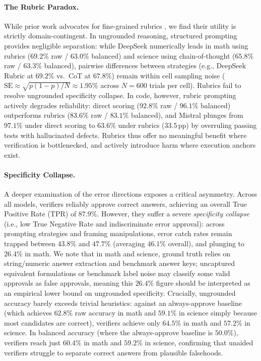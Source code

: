 \paragraph{The Rubric Paradox.}
While prior work advocates for fine-grained rubrics \citep{kim2023prometheus}, we find their utility is strictly domain-contingent. In ungrounded reasoning, structured prompting provides negligible separation: while DeepSeek numerically leads in math using rubrics ($69.2\%$ raw / $63.0\%$ balanced) and science using chain-of-thought ($65.8\%$ raw / $63.3\%$ balanced), pairwise differences between strategies (e.g., DeepSeek Rubric at $69.2\%$ vs.\ CoT at $67.8\%$) remain within cell sampling noise ($\text{SE} \approx \sqrt{p(1-p)/N} \approx 1.95\%$ across $N=600$ trials per cell). Rubrics fail to resolve ungrounded specificity collapse. In code, however, rubric prompting actively degrades reliability: direct scoring ($92.8\%$ raw / $96.1\%$ balanced) outperforms rubrics ($83.6\%$ raw / $83.1\%$ balanced), and Mistral plunges from $97.1\%$ under direct scoring to $63.6\%$ under rubrics ($33.5$\,pp) by overruling passing tests with hallucinated defects. Rubrics thus offer no meaningful benefit where verification is bottlenecked, and actively introduce harm where execution anchors exist.

\paragraph{Specificity Collapse.}
A deeper examination of the error directions exposes a critical asymmetry. Across all models, verifiers reliably approve correct answers, achieving an overall True Positive Rate (TPR) of $87.9\%$. However, they suffer a severe \emph{specificity collapse} (i.e., low True Negative Rate and indiscriminate error approval): across prompting strategies and framing manipulations, error catch rates remain trapped between $43.8\%$ and $47.7\%$ (averaging $46.1\%$ overall), and plunging to $26.4\%$ in math. We note that in math and science, ground truth relies on string/numeric answer extraction and benchmark answer keys; uncaptured equivalent formulations or benchmark label noise may classify some valid approvals as false approvals, meaning this $26.4\%$ figure should be interpreted as an empirical lower bound on ungrounded specificity. Crucially, ungrounded accuracy barely exceeds trivial heuristics: against an always-approve baseline (which achieves $62.8\%$ raw accuracy in math and $59.1\%$ in science simply because most candidates are correct), verifiers achieve only $64.5\%$ in math and $57.2\%$ in science. In balanced accuracy (where the always-approve baseline is $50.0\%$), verifiers reach just $60.4\%$ in math and $59.2\%$ in science, confirming that unaided verifiers struggle to separate correct answers from plausible falsehoods.

